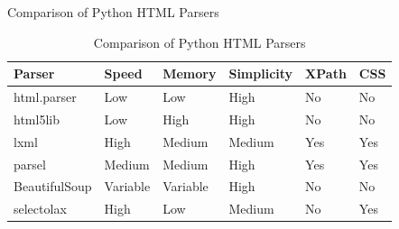 \documentclass[10pt]{beamer}
\begin{document}
	\begin{frame}{Comparison of Python HTML Parsers}
		\begin{table}
			\centering
			\begin{adjustbox}{scale=.65}
			\begin{tabular}[]{>{\centering\arraybackslash}p{3cm} |*{5}{>{\centering\arraybackslash}p{1.9cm}}}
				\hline
				\rowcolor[gray]{.85}
				Parser & Speed & Memory & Simplicity & {XPath} & {CSS} \\
				\hline
				\cellcolor{white} {html.parser} & \cellcolor{red!50} Low & \cellcolor{green!50} Low & \cellcolor{green!50} High & \cellcolor{red!50} No & \cellcolor{red!50} No \\
				
				\cellcolor{white} {html5lib} & \cellcolor{red!50} Low & \cellcolor{red!50} High & \cellcolor{green!50} High & \cellcolor{red!50} No & \cellcolor{red!50} No \\
				
				\cellcolor{pink!40} {lxml} & \cellcolor{green!50} High & \cellcolor{yellow!50} Medium & \cellcolor{yellow!50} Medium & \cellcolor{green!50} Yes & \cellcolor{green!50} Yes \\
				
				\cellcolor{white} {parsel} & \cellcolor{yellow!50} Medium & \cellcolor{yellow!50} Medium & \cellcolor{green!50} High & \cellcolor{green!50} Yes & \cellcolor{green!50} Yes \\
				
				\cellcolor{white} {BeautifulSoup} & \cellcolor{white} Variable & \cellcolor{white} Variable & \cellcolor{green!50} High & \cellcolor{red!50} No & \cellcolor{red!50} No \\
				
				\cellcolor{pink!40} {selectolax} & \cellcolor{green!50} High & \cellcolor{green!50} Low & \cellcolor{yellow!50} Medium & \cellcolor{red!50} No & \cellcolor{green!50} Yes \\
				\hline
			\end{tabular}
			\end{adjustbox}
			\caption{Comparison of Python HTML Parsers}
			\label{tab:parser-benchmarks}
		\end{table}
	\end{frame}
	
\end{document}
